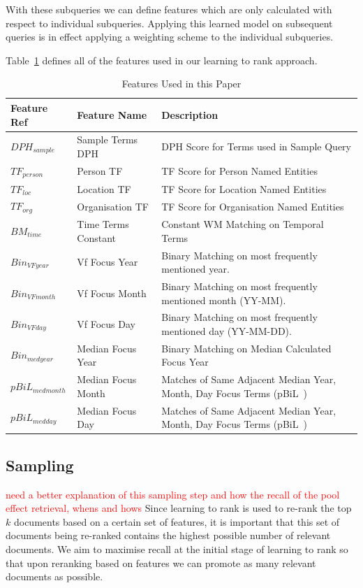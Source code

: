 \documentclass{mpaper}
\let\oldcite=\cite
\renewcommand\cite[1]{\ifthenelse{\equal{#1}{NEEDED}}{\ensuremath{^\texttt{[citation~needed]}}}{\oldcite{#1}}}
\newcommand{\remove}[1]{\textcolor{red}{#1}}
\begin{document}
With these subqueries we can define features which are only calculated with respect to individual subqueries. Applying this learned model on subsequent queries is in effect applying a weighting scheme to the individual subqueries.

Table~\ref{table:features} defines all of the features used in our learning to rank approach.

\begin{table}[t] 
\centering
\begin{tabular}{|p{2cm}|p{4cm}|p{6cm}|}
\hline
Feature Ref   & Feature Name 		& Description  \\ \hline
$DPH_{sample}$ & Sample Terms DPH 	& DPH Score for Terms used in Sample Query \\ \hline
$TF_{person}$ &Person TF 		& TF Score for Person Named Entities \\
$TF_{loc}$&Location TF 		
& TF Score for Location Named Entities 		\\ 
$TF_{org}$&Organisation TF 	
& TF Score for Organisation Named Entities  \\
\hline
$BM_{time} $&Time Terms Constant 
& Constant WM Matching on Temporal Terms    \\
\hline
$Bin_{VFyear}$ & Vf Focus Year 		
& Binary Matching on most frequently mentioned year. \\
$Bin_{VFmonth}$ & Vf Focus Month 		
&Binary Matching on most frequently mentioned month (YY-MM). \\
$Bin_{VFday}$ & Vf Focus Day 		
& Binary Matching on most frequently mentioned day (YY-MM-DD).\\
\hline
$Bin_{medyear} $& Median Focus Year 	
& Binary Matching on Median Calculated Focus Year 		  \\ 
$pBiL_{medmonth} $& Median Focus Month 	
&Matches of Same Adjacent Median Year, Month, Day Focus Terms (pBiL~\cite{pbil}) \\ 
$pBiL_{medday} $& Median Focus Day 	
& Matches of Same Adjacent Median Year, Month, Day Focus Terms (pBiL~\cite{pbil}) \\ \hline
\end{tabular}
\caption{Features Used in this Paper}
\label{table:features}
\end{table}

\subsection{Sampling}
\remove{need a better explanation of this sampling step and how the recall of the pool effect retrieval, whens and hows}
Since learning to rank is used to re-rank the top $k$ documents based on a certain set of features, it is important that this set of documents being re-ranked contains the highest possible number of relevant documents.
We aim to maximise recall at the initial stage of learning to rank so that upon reranking based on features we can promote as many relevant documents as possible.
\end{document}
